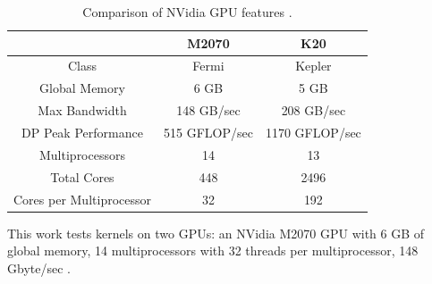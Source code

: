 \documentclass{report}
\begin{document}
\begin{table}[h]
\centering
\caption{Comparison of NVidia GPU features \cite{M2070FactSheet,KeplerFactSheet}.}
\label{tbl:gpu_comparison}
\begin{tabular}{c|c|c}
 & M2070  & K20 \\ \hline
Class & Fermi & Kepler \\ \hline
Global Memory & 6 GB & 5 GB \\ 
Max Bandwidth & 148 GB/sec & 208 GB/sec \\ 
DP Peak Performance & 515 GFLOP/sec & 1170 GFLOP/sec \\ 
Multiprocessors & 14 & 13 \\ 
Total Cores & 448 & 2496 \\ 
Cores per Multiprocessor & 32 & 192 \\ \hline
\end{tabular}
\end{table}


This work tests kernels on two GPUs: an NVidia M2070 GPU with 6 GB of global memory, 14 multiprocessors with 32 threads per multiprocessor,  148 Gbyte/sec . 
\end{document}
